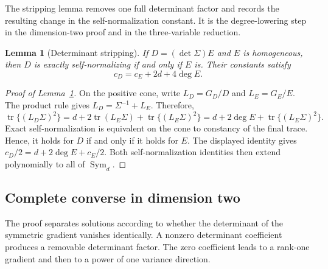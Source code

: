 \documentclass[12pt,a4paper]{article}
\theoremstyle{plain}
\newtheorem{lemma}{Lemma}
\theoremstyle{definition}
\newcommand{\Sym}{\operatorname{Sym}}
\newcommand{\tr}{\operatorname{tr}}
\begin{document}
The stripping lemma removes one full determinant factor and records the resulting change in the self-normalization constant.
It is the degree-lowering step in the dimension-two proof and in the three-variable reduction.

\begin{lemma}[Determinant stripping]
\label{lem:strip-supp}
    If $D=(\det\Sigma)E$ and $E$ is homogeneous, then $D$ is exactly self-normalizing if and only if $E$ is.
    Their constants satisfy
    \begin{equation*}
        c_D
        =
        c_E+2d+4\deg E
        .
    \end{equation*}
\end{lemma}

\begin{proof}[Proof of Lemma~\ref{lem:strip-supp}]
    On the positive cone, write $L_D=G_D/D$ and $L_E=G_E/E$.
    The product rule gives $L_D=\Sigma^{-1}+L_E$.
    Therefore,
    \begin{equation*}
        \tr\{(L_D\Sigma)^2\}
        =
        d+2\tr(L_E\Sigma)+\tr\{(L_E\Sigma)^2\}
        =
        d+2\deg E+\tr\{(L_E\Sigma)^2\}
        .
    \end{equation*}
    Exact self-normalization is equivalent on the cone to constancy of the final trace.
    Hence, it holds for $D$ if and only if it holds for $E$.
    The displayed identity gives $c_D/2=d+2\deg E+c_E/2$.
    Both self-normalization identities then extend polynomially to all of $\Sym_d$.
\end{proof}

\subsection{Complete converse in dimension two}
\label{supp:d2-converse}

The proof separates solutions according to whether the determinant of the symmetric gradient vanishes identically.
A nonzero determinant coefficient produces a removable determinant factor.
The zero coefficient leads to a rank-one gradient and then to a power of one variance direction.
\end{document}
